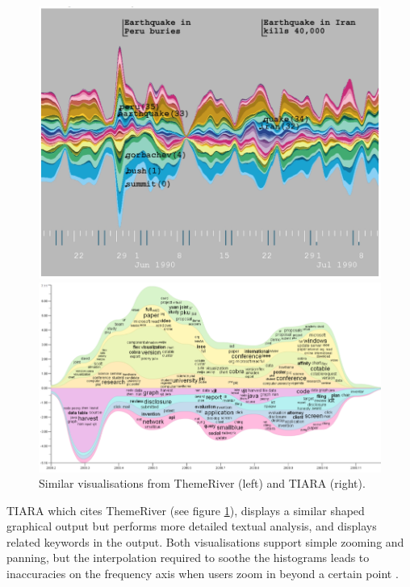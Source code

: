 \begin{figure}[h]
\centering
\begin{minipage}{.45\textwidth}
  \centering
  \hspace{-1cm}\includegraphics[width=.9\linewidth]{img/lit-survey/histogram1.png}
  \end{minipage}%
\begin{minipage}{.65\textwidth}
  \centering
  \hspace{-1.5cm}\includegraphics[width=.9\linewidth]{img/lit-survey/histogram2.png}
\end{minipage}
\caption{Similar visualisations from ThemeRiver \citep{ThemeRiver} (left) and TIARA \citep{InteractiveTopicBasedVisualTextSummarizationAndAnalysis} (right).}
  \label{fig:themeriver-tiara}

\end{figure}

TIARA \citep{InteractiveTopicBasedVisualTextSummarizationAndAnalysis} which cites ThemeRiver  (see figure \ref{fig:themeriver-tiara}), displays a similar shaped graphical output but performs more detailed textual analysis, and displays related keywords in the output. Both visualisations support simple zooming and panning, but the interpolation required to soothe the histograms leads to inaccuracies on the frequency axis when users zoom in beyond a certain point \citep{ThemeRiver}.

